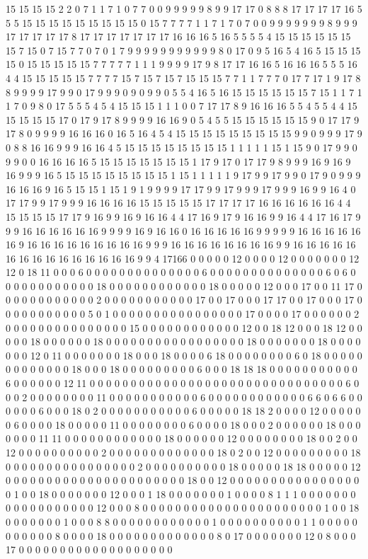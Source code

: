 15 15 15 15 2 2 0 7 1 1 7 1 0 7 7 0 0 9 9 9 9 9 8 9 9 17 17 0 8 8 8 17 17 17 17 16 5 5 5 15 15 15 15 15 15 15 15 15 0 15 7 7 7 7 1 1 7 1 7 0 7 0 0 9 9 9 9 9 9 9 8 9 9 9 17 17 17 17 17 8 17 17 17 17 17 17 17 16 16 16 5 16 5 5 5 5 4 15 15 15 15 15 15 15 7 15 0 7 15 7 7 0 7 0 1 7 9 9 9 9 9 9 9 9 9 9 9 8 0 17 0 9 5 16 5 4 16 5 15 15 15 15 0 15 15 15 15 15 7 7 7 7 7 1 1 1 9 9 9 9 17 9 8 17 17 16 16 5 16 16 16 5 5 5 16 4 4 15 15 15 15 15 7 7 7 7 15 7 15 7 15 7 15 15 15 7 7 1 1 7 7 7 0 17 7 17 1 9 17 8 8 9 9 9 9 17 9 9 0 17 9 9 9 0 9 0 9 9 0 5 5 4 16 5 16 15 15 15 15 15 15 7 15 1 1 7 1 1 7 0 9 8 0 17 5 5 5 4 5 4 15 15 15 1 1 1 0 0 7 17 17 8 9 16 16 16 5 5 4 5 5 4 4 15 15 15 15 15 17 0 17 9 17 8 9 9 9 9 16 16 9 0 5 4 5 5 15 15 15 15 15 15 9 0 17 17 9 17 8 0 9 9 9 9 16 16 16 0 16 5 16 4 5 4 15 15 15 15 15 15 15 15 15 9 9 0 9 9 9 17 9 0 8 8 16 16 9 9 9 16 16 4 5 15 15 15 15 15 15 15 15 1 1 1 1 1 15 1 15 9 0 17 9 9 0 9 9 0 0 16 16 16 16 5 15 15 15 15 15 15 15 1 17 9 17 0 17 17 9 8 9 9 9 16 9 16 9 16 9 9 9 16 5 15 15 15 15 15 15 15 15 1 15 1 1 1 1 1 9 17 9 9 17 9 9 0 17 9 0 9 9 9 16 16 16 9 16 5 15 15 1 15 1 9 1 9 9 9 9 17 17 9 9 17 9 9 9 17 9 9 9 16 9 9 16 4 0 17 17 9 9 17 9 9 9 16 16 16 16 15 15 15 15 15 17 17 17 17 16 16 16 16 16 16 4 4 15 15 15 15 17 17 9 16 9 9 16 9 16 16 4 4 17 16 9 17 9 16 16 9 9 16 4 4 17 16 17 9 9 9 16 16 16 16 16 16 9 9 9 9 16 9 16 16 0 16 16 16 16 16 9 9 9 9 9 16 16 16 16 16 16 9 16 16 16 16 16 16 16 16 16 9 9 9 16 16 16 16 16 16 16 16 9 9 16 16 16 16 16 16 16 16 16 16 16 16 16 16 16 9 9 4 17166 0 0 0 0 0 12 0 0 0 0 12 0 0 0 0 0 0 0 12 12 0 18 11 0 0 0 6 0 0 0 0 0 0 0 0 0 0 0 0 0 0 6 0 0 0 0 0 0 0 0 0 0 0 0 0 0 6 0 6 0 0 0 0 0 0 0 0 0 0 0 0 18 0 0 0 0 0 0 0 0 0 0 0 0 18 0 0 0 0 0 12 0 0 0 17 0 0 11 17 0 0 0 0 0 0 0 0 0 0 0 0 2 0 0 0 0 0 0 0 0 0 0 0 17 0 0 17 0 0 0 17 17 0 0 17 0 0 0 17 0 0 0 0 0 0 0 0 0 0 0 5 0 1 0 0 0 0 0 0 0 0 0 0 0 0 0 0 0 0 17 0 0 0 0 17 0 0 0 0 0 0 2 0 0 0 0 0 0 0 0 0 0 0 0 0 0 0 15 0 0 0 0 0 0 0 0 0 0 0 0 12 0 0 18 12 0 0 0 18 12 0 0 0 0 0 18 0 0 0 0 0 0 18 0 0 0 0 0 0 0 0 0 0 0 0 0 0 0 0 0 18 0 0 0 0 0 0 0 18 0 0 0 0 0 0 0 12 0 11 0 0 0 0 0 0 0 18 0 0 0 18 0 0 0 0 6 18 0 0 0 0 0 0 0 0 6 0 18 0 0 0 0 0 0 0 0 0 0 0 0 0 18 0 0 0 18 0 0 0 0 0 0 0 0 0 6 0 0 0 18 18 18 0 0 0 0 0 0 0 0 0 0 0 6 0 0 0 0 0 0 12 11 0 0 0 0 0 0 0 0 0 0 0 0 0 0 0 0 0 0 0 0 0 0 0 0 0 0 0 0 0 0 0 6 0 0 0 2 0 0 0 0 0 0 0 0 11 0 0 0 0 0 0 0 0 0 0 0 6 0 0 0 0 0 0 0 0 0 0 0 0 6 6 0 6 6 0 0 0 0 0 0 6 0 0 0 18 0 2 0 0 0 0 0 0 0 0 0 0 0 6 0 0 0 0 0 18 18 2 0 0 0 0 12 0 0 0 0 0 0 6 0 0 0 0 18 0 0 0 0 0 11 0 0 0 0 0 0 0 0 6 0 0 0 0 18 0 0 0 2 0 0 0 0 0 0 18 0 0 0 0 0 0 0 11 11 0 0 0 0 0 0 0 0 0 0 0 0 18 0 0 0 0 0 0 12 0 0 0 0 0 0 0 0 18 0 0 2 0 0 12 0 0 0 0 0 0 0 0 0 0 2 0 0 0 0 0 0 0 0 0 0 0 0 0 18 0 2 0 0 12 0 0 0 0 0 0 0 0 0 18 0 0 0 0 0 0 0 0 0 0 0 0 0 0 0 0 2 0 0 0 0 0 0 0 0 0 0 18 0 0 0 0 0 18 18 0 0 0 0 0 12 0 0 0 0 0 0 0 0 0 0 0 0 0 0 0 0 0 0 0 0 0 0 18 0 0 12 0 0 0 0 0 0 0 0 0 0 0 0 0 0 0 0 0 1 0 0 18 0 0 0 0 0 0 0 12 0 0 0 1 18 0 0 0 0 0 0 0 1 0 0 0 0 8 1 1 1 0 0 0 0 0 0 0 0 0 0 0 0 0 0 0 0 0 0 12 0 0 0 8 0 0 0 0 0 0 0 0 0 0 0 0 0 0 0 0 0 0 0 0 0 0 1 0 0 18 0 0 0 0 0 0 0 1 0 0 0 8 8 0 0 0 0 0 0 0 0 0 0 0 0 1 0 0 0 0 0 0 0 0 0 0 1 1 0 0 0 0 0 0 0 0 0 0 0 8 0 0 0 0 18 0 0 0 0 0 0 0 0 0 0 0 0 0 8 0 17 0 0 0 0 0 0 0 12 0 8 0 0 0 17 0 0 0 0 0 0 0 0 0 0 0 0 0 0 0 0 0 0 0 